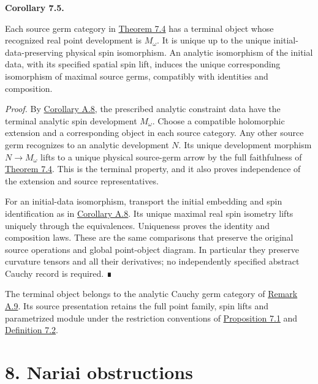 \documentclass[
  english,
  11pt,
  reqno]{amsart}
\makeatletter
\newcommand{\pandocstatementheading}[1]{%
  \par\addpenalty{\@beginparpenalty}%
  \addvspace{.5\baselineskip plus .2\baselineskip minus .2\baselineskip}%
  {\normalfont\bfseries #1\par}%
  \nobreak\@afterindenttrue\@afterheading
}
\makeatother
\begin{document}
\pandocstatementheading{\protect{}\label{cor:maximal-source-atlas-germ-v08}Corollary 7.5.}

Each source germ category in
\hyperref[thm:source-atlas-cauchy-equivalence-v08]{Theorem 7.4} has a
terminal object whose recognized real point development is \(M_\omega\).
It is unique up to the unique initial-data-preserving physical spin
isomorphism. An analytic isomorphism of the initial data, with its
specified spatial spin lift, induces the unique corresponding
isomorphism of maximal source germs, compatibly with identities and
composition.

\emph{Proof.} By \hyperref[cor:analytic-cauchy-naturality-v08]{Corollary
A.8}, the prescribed analytic constraint data have the terminal analytic
spin development \(M_\omega\). Choose a compatible holomorphic extension
and a corresponding object in each source category. Any other source
germ recognizes to an analytic development \(N\). Its unique development
morphism \(N\to M_\omega\) lifts to a unique physical source-germ arrow
by the full faithfulness of
\hyperref[thm:source-atlas-cauchy-equivalence-v08]{Theorem 7.4}. This is
the terminal property, and it also proves independence of the extension
and source representatives.

For an initial-data isomorphism, transport the initial embedding and
spin identification as in
\hyperref[cor:analytic-cauchy-naturality-v08]{Corollary A.8}. Its unique
maximal real spin isometry lifts uniquely through the equivalences.
Uniqueness proves the identity and composition laws. These are the same
comparisons that preserve the original source operations and global
point-object diagram. In particular they preserve curvature tensors and
all their derivatives; no independently specified abstract Cauchy record
is required. ∎

The terminal object belongs to the analytic Cauchy germ category of
\hyperref[rem:analytic-maximality-scope]{Remark A.9}. Its source
presentation retains the full point family, spin lifts and parametrized
module under the restriction conventions of
\hyperref[prop:recomputed-monodromy-restriction]{Proposition 7.1} and
\hyperref[def:entire-real-source-germs-v08]{Definition 7.2}.

\protect{}\label{sec:nariai-obstructions-v08}

\section{8. Nariai obstructions}\label{nariai-obstructions}
\end{document}
